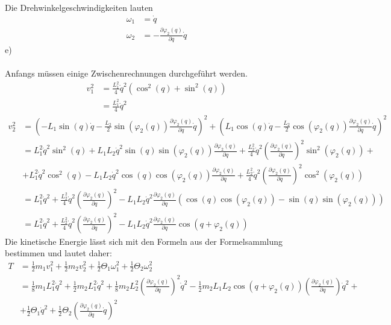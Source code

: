 Die Drehwinkelgeschwindigkeiten lauten
\begin{align*}
	\omega_1 &= \dot{q} \\
	\omega_2 &= - \frac{\partial \varphi_2(q)}{\partial q} \dot{q}
\end{align*}
e) \\ \\
Anfangs müssen einige Zwischenrechnungen durchgeführt werden.
\begin{align*}
	v_1^2 &= \frac{L_1^2}{4}\dot{q}^2(\cos^2(q) + \sin^2(q)) \\
		  &= \frac{L_1^2}{4}\dot{q}^2
\end{align*}
\begin{align*}
	v_2^2 &= \left(-L_1\sin(q)\dot{q} - \frac{L_2}{2}\sin(\varphi_2(q))\frac{\partial \varphi_2(q)}{\partial q}\dot{q}\right)^2 + \left(L_1\cos(q)\dot{q} - \frac{L_2}{2}\cos(\varphi_2(q))\frac{\partial \varphi_2(q)}{\partial q}\dot{q}\right)^2 \\
	&= L_1^2\dot{q}^2\sin^2(q) + L_1L_2\dot{q}^2\sin(q)\sin(\varphi_2(q))\frac{\partial \varphi_2(q)}{\partial q} + \frac{L_2^2}{4}\dot{q}^2\left(\frac{\partial \varphi_2(q)}{\partial q}\right)^2\sin^2(\varphi_2(q)) + \\
	&+ L_1^2\dot{q}^2\cos^2(q) - L_1L_2\dot{q}^2\cos(q)\cos(\varphi_2(q))\frac{\partial \varphi_2(q)}{\partial q} + \frac{L_2^2}{4}\dot{q}^2\left(\frac{\partial \varphi_2(q)}{\partial q}\right)^2\cos^2(\varphi_2(q)) \\
	&= L_1^2\dot{q}^2 + \frac{L_2^2}{4}\dot{q}^2\left(\frac{\partial \varphi_2(q)}{\partial q}\right)^2 - L_1L_2\dot{q}^2\frac{\partial \varphi_2(q)}{\partial q}(\cos(q)\cos(\varphi_2(q)) - \sin(q)\sin(\varphi_2(q))) \\
	&= L_1^2\dot{q}^2 + \frac{L_2^2}{4}\dot{q}^2\left(\frac{\partial \varphi_2(q)}{\partial q}\right)^2 - L_1L_2\dot{q}^2\frac{\partial \varphi_2(q)}{\partial q}\cos(q + \varphi_2(q))
\end{align*}
Die kinetische Energie lässt sich mit den Formeln aus der Formelsammlung bestimmen und lautet daher:
\begin{align*}
	T &= \frac{1}{2} m_1v_1^2 + \frac{1}{2}m_2v_2^2 + \frac{1}{2} \Theta_1 \omega_1^2 + \frac{1}{2}\Theta_2\omega_2^2 \\
	&= \frac{1}{8}m_1L_1^2\dot{q}^2 + \frac{1}{2}m_2L_1^2\dot{q}^2 + \frac{1}{8}m_2L_2^2\left(\frac{\partial \varphi_2(q)}{\partial q}\right)^2\dot{q}^2 - \frac{1}{2}m_2L_1L_2\cos(q + \varphi_2(q))\left(\frac{\partial \varphi_2(q)}{\partial q}\right)\dot{q}^2 + \\
	&+ \frac{1}{2}\Theta_1\dot{q}^2 + \frac{1}{2}\Theta_2\left(\frac{\partial \varphi_2(q)}{\partial q}\dot{q}\right)^2
\end{align*}
